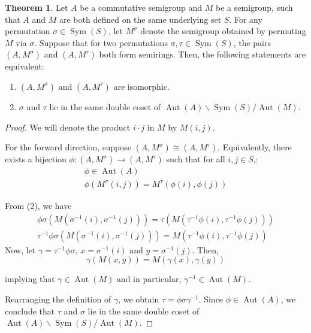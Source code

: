 \documentclass{article}
\theoremstyle{definition}
\newtheorem{theorem}{Theorem}
\begin{document}
\begin{theorem}
    Let \(A\) be a commutative semigroup and \(M\) be a semigroup, such that \(A\) and \(M\) are both defined on the same underlying set \(S\). For any permutation \(\sigma \in \operatorname{Sym}(S)\), let \(M^\sigma\) denote the semigroup obtained by permuting \(M\) via \(\sigma\). Suppose that for two permutations \(\sigma, \tau\in\operatorname{Sym}(S)\), the pairs \((A,M^\sigma)\) and \((A,M^\tau)\) both form semirings. Then, the following statements are equivalent:
    \begin{enumerate}
        \item \((A, M^\sigma)\) and \((A, M^\tau)\) are isomorphic.
        \item \(\sigma\) and \(\tau\) lie in the same double coset of \(\operatorname{Aut}(A) \backslash \operatorname{Sym}(S) / \operatorname{Aut}(M)\).
    \end{enumerate}
\begin{proof}
    We will denote the product \(i\cdot j\) in \(M\) by \(M(i,j)\).

    For the forward direction, suppose \((A, M^\sigma) \cong (A, M^\tau)\). Equivalently, there exists a bijection \(\phi: (A, M^\sigma) \to (A, M^\tau)\) such that for all \(i, j \in S\),:
    \begin{gather}
         \phi \in \operatorname{Aut}(A)\\
         \phi(M^\sigma(i,j)) = M^\tau(\phi(i),\phi(j))
    \end{gather}

    From (2), we have
    \begin{gather*}
        \phi\sigma(M(\sigma^{-1}(i), \sigma^{-1}(j))) = \tau(M(\tau^{-1}\phi(i), \tau^{-1}\phi(j))) \\
        \tau^{-1}\phi\sigma(M(\sigma^{-1}(i), \sigma^{-1}(j))) = M(\tau^{-1}\phi(i), \tau^{-1}\phi(j))
    \end{gather*}
    Now, let \(\gamma = \tau^{-1}\phi\sigma\), \(x = \sigma^{-1}(i)\text{ and }y=\sigma^{-1}(j)\). Then,
    \[
        \gamma(M(x, y)) = M(\gamma(x), \gamma(y))
    \]

    implying that \(\gamma \in \operatorname{Aut}(M) \text{ and in particular, } \gamma^{-1} \in \operatorname{Aut}(M)\). 
    
    Rearranging the definition of \(\gamma\), we obtain \(\tau = \phi\sigma\gamma^{-1}\). Since \(\phi \in \operatorname{Aut}(A)\), we conclude that \(\tau\) and \(\sigma\) lie in the same double coset of \(\operatorname{Aut}(A) \backslash \operatorname{Sym}(S) / \operatorname{Aut}(M)\).


\end{proof}
\end{theorem}
\end{document}
